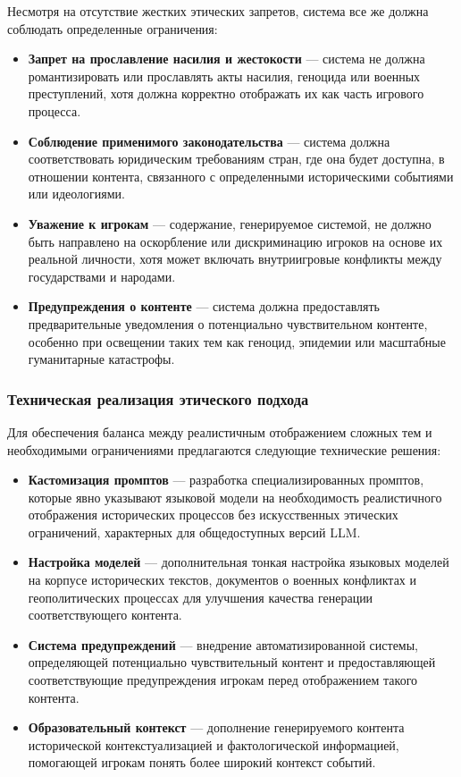 Несмотря на отсутствие жестких этических запретов, система все же должна соблюдать определенные ограничения:

\begin{itemize}
    \item \textbf{Запрет на прославление насилия и жестокости} — система не должна романтизировать или прославлять акты насилия, геноцида или военных преступлений, хотя должна корректно отображать их как часть игрового процесса.

    \item \textbf{Соблюдение применимого законодательства} — система должна соответствовать юридическим требованиям стран, где она будет доступна, в отношении контента, связанного с определенными историческими событиями или идеологиями.

    \item \textbf{Уважение к игрокам} — содержание, генерируемое системой, не должно быть направлено на оскорбление или дискриминацию игроков на основе их реальной личности, хотя может включать внутриигровые конфликты между государствами и народами.

    \item \textbf{Предупреждения о контенте} — система должна предоставлять предварительные уведомления о потенциально чувствительном контенте, особенно при освещении таких тем как геноцид, эпидемии или масштабные гуманитарные катастрофы.
\end{itemize}

\subsubsection{Техническая реализация этического подхода}

Для обеспечения баланса между реалистичным отображением сложных тем и необходимыми ограничениями предлагаются следующие технические решения:

\begin{itemize}
    \item \textbf{Кастомизация промптов} — разработка специализированных промптов, которые явно указывают языковой модели на необходимость реалистичного отображения исторических процессов без искусственных этических ограничений, характерных для общедоступных версий LLM.

    \item \textbf{Настройка моделей} — дополнительная тонкая настройка языковых моделей на корпусе исторических текстов, документов о военных конфликтах и геополитических процессах для улучшения качества генерации соответствующего контента.

    \item \textbf{Система предупреждений} — внедрение автоматизированной системы, определяющей потенциально чувствительный контент и предоставляющей соответствующие предупреждения игрокам перед отображением такого контента.

    \item \textbf{Образовательный контекст} — дополнение генерируемого контента исторической контекстуализацией и фактологической информацией, помогающей игрокам понять более широкий контекст событий.
\end{itemize}

